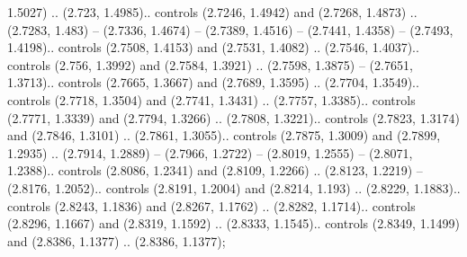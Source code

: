 1.5027) .. (2.723, 1.4985).. controls (2.7246, 1.4942) and (2.7268, 1.4873) .. (2.7283, 1.483) -- (2.7336, 1.4674) -- (2.7389, 1.4516) -- (2.7441, 1.4358) -- (2.7493, 1.4198).. controls (2.7508, 1.4153) and (2.7531, 1.4082) .. (2.7546, 1.4037).. controls (2.756, 1.3992) and (2.7584, 1.3921) .. (2.7598, 1.3875) -- (2.7651, 1.3713).. controls (2.7665, 1.3667) and (2.7689, 1.3595) .. (2.7704, 1.3549).. controls (2.7718, 1.3504) and (2.7741, 1.3431) .. (2.7757, 1.3385).. controls (2.7771, 1.3339) and (2.7794, 1.3266) .. (2.7808, 1.3221).. controls (2.7823, 1.3174) and (2.7846, 1.3101) .. (2.7861, 1.3055).. controls (2.7875, 1.3009) and (2.7899, 1.2935) .. (2.7914, 1.2889) -- (2.7966, 1.2722) -- (2.8019, 1.2555) -- (2.8071, 1.2388).. controls (2.8086, 1.2341) and (2.8109, 1.2266) .. (2.8123, 1.2219) -- (2.8176, 1.2052).. controls (2.8191, 1.2004) and (2.8214, 1.193) .. (2.8229, 1.1883).. controls (2.8243, 1.1836) and (2.8267, 1.1762) .. (2.8282, 1.1714).. controls (2.8296, 1.1667) and (2.8319, 1.1592) .. (2.8333, 1.1545).. controls (2.8349, 1.1499) and (2.8386, 1.1377) .. (2.8386, 1.1377);



